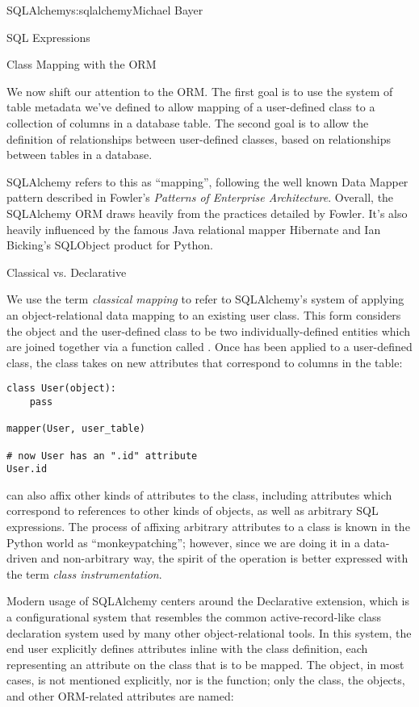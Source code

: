 \begin{aosachapter}{SQLAlchemy}{s:sqlalchemy}{Michael Bayer}
\begin{aosasect1}{SQL Expressions}
\end{aosasect1}

\begin{aosasect1}{Class Mapping with the ORM}

We now shift our attention to the ORM.   The first goal is to use the system of table metadata we've defined
to allow mapping of a user-defined class to a collection of columns in a database table.   The second goal is to allow
the definition of relationships between user-defined classes, based on relationships between tables in a database.

SQLAlchemy refers to this as ``mapping'', following the well known Data Mapper pattern described
in Fowler's \emph{Patterns of Enterprise Architecture}.   Overall, the SQLAlchemy ORM draws heavily
from the practices detailed by Fowler.  It's also heavily influenced by the famous Java
relational mapper Hibernate and Ian Bicking's SQLObject product for Python.

\begin{aosasect2}{Classical vs. Declarative}

We use the term \emph{classical mapping} to refer to SQLAlchemy's system of
applying an object-relational data mapping to an existing user class. This
form considers the  object and the user-defined class to be two
individually-defined entities which are joined together via a function called
. Once  has been applied to a user-defined class, the
class takes on new attributes that correspond to columns in the table:

\newpage %

\begin{verbatim}
class User(object):
    pass

mapper(User, user_table)

# now User has an ".id" attribute
User.id
\end{verbatim}

\noindent {} can also affix other kinds of attributes to the class, including
attributes which correspond to references to other kinds of objects, as well
as arbitrary SQL expressions.  The process of affixing arbitrary attributes to
a class is known in the Python world as ``monkeypatching''; however, since we are
doing it in a data-driven and non-arbitrary way, the spirit of the operation is
better expressed with the term \emph{class instrumentation}.

Modern usage of SQLAlchemy centers around the Declarative extension,
which is a configurational system that resembles the common
active-record-like class declaration system used by many other
object-relational tools. In this system, the end user explicitly defines
attributes inline with the class definition, each representing an attribute on
the class that is to be mapped. The  object, in most cases, is not
mentioned explicitly, nor is the  function; only the class, the
 objects, and other ORM-related attributes are named:


\end{aosasect2}
\end{aosasect1}
\end{aosachapter}
